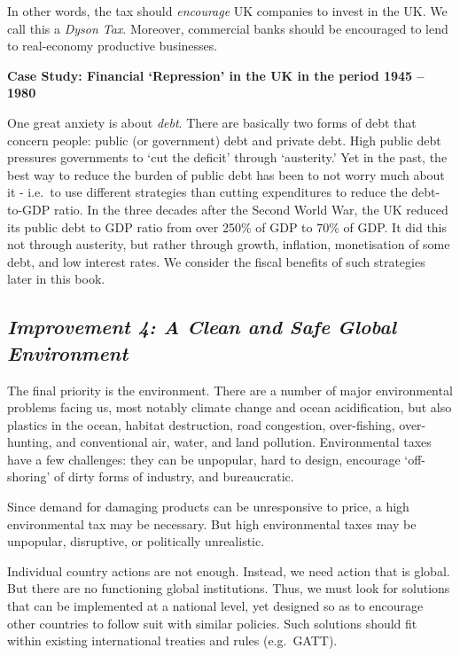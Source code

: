 \documentclass[]{tufte-handout}
\begin{document}
In other words, the tax should \emph{encourage} UK companies to invest
in the UK. We call this a \emph{Dyson Tax}. Moreover, commercial banks
should be encouraged to lend to real-economy productive businesses.

\textbf{Case Study: Financial `Repression' in the UK in the period 1945
-- 1980}

One great anxiety is about \emph{debt}. There are basically two forms of
debt that concern people: public (or government) debt and private debt.
High public debt pressures governments to `cut the deficit' through
`austerity.' Yet in the past, the best way to reduce the burden of
public debt has been to not worry much about it - i.e.~to use different
strategies than cutting expenditures to reduce the debt-to-GDP ratio. In
the three decades after the Second World War, the UK reduced its public
debt to GDP ratio from over 250\% of GDP to 70\% of GDP. It did this not
through austerity, but rather through growth, inflation, monetisation of
some debt, and low interest rates. We consider the fiscal benefits of
such strategies later in this book.

\hypertarget{improvement-4-a-clean-and-safe-global-environment}{%
\subsection{\texorpdfstring{\emph{Improvement 4: A Clean and Safe Global
Environment}}{Improvement 4: A Clean and Safe Global Environment}}\label{improvement-4-a-clean-and-safe-global-environment}}

The final priority is the environment. There are a number of major
environmental problems facing us, most notably climate change and ocean
acidification, but also plastics in the ocean, habitat destruction, road
congestion, over-fishing, over-hunting, and conventional air, water, and
land pollution. Environmental taxes have a few challenges: they can be
unpopular, hard to design, encourage `off-shoring' of dirty forms of
industry, and bureaucratic.

Since demand for damaging products can be unresponsive to price, a high
environmental tax may be necessary. But high environmental taxes may be
unpopular, disruptive, or politically unrealistic.

Individual country actions are not enough. Instead, we need action that
is global. But there are no functioning global institutions. Thus, we
must look for solutions that can be implemented at a national level, yet
designed so as to encourage other countries to follow suit with similar
policies. Such solutions should fit within existing international
treaties and rules (e.g.~GATT).
\end{document}
